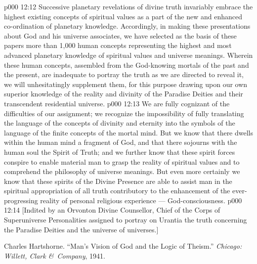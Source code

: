 \vs p000 12:12 Successive planetary revelations of divine truth invariably embrace the highest existing concepts of spiritual values as a part of the new and enhanced co\hyp{}ordination of planetary knowledge. Accordingly, in making these presentations about God and his universe associates, we have selected as the basis of these papers more than 1,000 human concepts representing the highest and most advanced planetary knowledge of spiritual values and universe meanings. Wherein these human concepts, assembled from the God\hyp{}knowing mortals of the past and the present, are inadequate to portray the truth as we are directed to reveal it, we will unhesitatingly supplement them, for this purpose drawing upon our own superior knowledge of the reality and divinity of the Paradise Deities and their transcendent residential universe.
\vs p000 12:13 We are fully cognizant of the difficulties of our assignment; we recognize the impossibility of fully translating the language of the concepts of divinity and eternity into the symbols of the language of the finite concepts of the mortal mind. But we know that there dwells within the human mind a fragment of God, and that there sojourns with the human soul the Spirit of Truth; and we further know that these spirit forces conspire to enable material man to grasp the reality of spiritual values and to comprehend the philosophy of universe meanings. But even more certainly we know that these spirits of the Divine Presence are able to assist man in the spiritual appropriation of all truth contributory to the enhancement of the ever\hyp{}progressing reality of personal religious experience --- God\hyp{}consciousness.
\vsetoff
\vs p000 12:14 [Indited by an Orvonton Divine Counsellor, Chief of the Corps of Superuniverse Personalities assigned to portray on Urantia the truth concerning the Paradise Deities and the universe of universes.]
\quizlink
\begin{thebibliography}{100}
Charles Hartshorne.
{``Man's Vision of God and the Logic of Theism.''}
{\em Chicago: Willett, Clark \&\ Company}, 1941.
\end{thebibliography}
